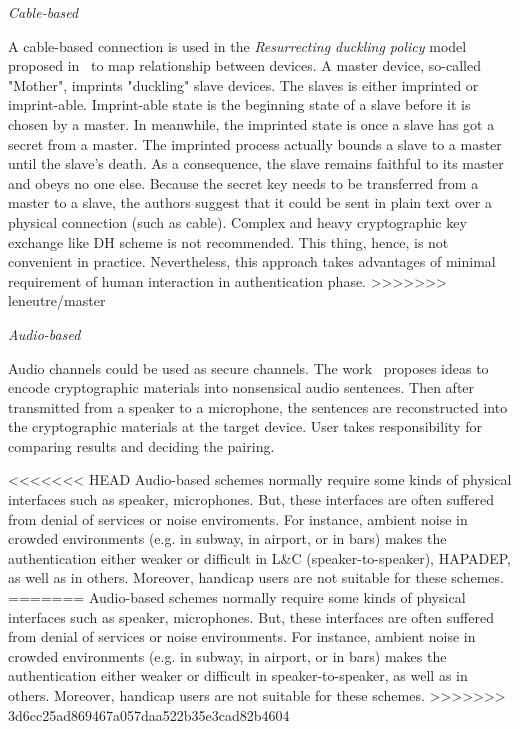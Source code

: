 \emph{Cable-based}

A cable-based connection is used in the \textit{Resurrecting duckling policy} model proposed in~\cite{Stajano:2000bs} to map relationship between devices. A master device, so-called "Mother", imprints "duckling" slave devices. The slaves is either imprinted or imprint-able. Imprint-able state is the beginning state of a slave before it is chosen by a master. In meanwhile, the imprinted state is once a slave has got a secret from a master. The imprinted process actually bounds a slave to a master until the slave's death. As a consequence, the slave remains faithful to its master and obeys no one else. Because the secret key needs to be transferred from a master to a slave, the authors suggest that it could be sent in plain text over a physical connection (such as cable). Complex and heavy cryptographic key exchange like DH scheme is not recommended. This thing, hence, is not convenient in practice. Nevertheless, this approach takes advantages of minimal requirement of human interaction in authentication phase. 
>>>>>>> leneutre/master

\emph{Audio-based}

Audio channels could be used as secure channels. The work~\cite{1648797, Soriente:2008, Lin:2011, Saxena:2008:UDP:1408664.1408672, 5678019, Sigg:2012aa} proposes ideas to encode cryptographic materials into nonsensical audio sentences. Then after transmitted from a speaker to a microphone, the sentences are reconstructed into the cryptographic materials at the target device. User takes responsibility for comparing results and deciding the pairing. 

<<<<<<< HEAD
Audio-based schemes normally require some kinds of physical interfaces such as speaker, microphones. But, these interfaces are often suffered from denial of services or noise enviroments. For instance, ambient noise in crowded environments (e.g. in subway, in airport, or in bars) makes the authentication either weaker or difficult in L\&C (speaker-to-speaker), HAPADEP, as well as in others. Moreover, handicap users are not suitable for these schemes. 
=======
Audio-based schemes normally require some kinds of physical interfaces such as speaker, microphones. But, these interfaces are often suffered from denial of services or noise environments. For instance, ambient noise in crowded environments (e.g. in subway, in airport, or in bars) makes the authentication either weaker or difficult in speaker-to-speaker, as well as in others. Moreover, handicap users are not suitable for these schemes. 
>>>>>>> 3d6cc25ad869467a057daa522b35e3cad82b4604

